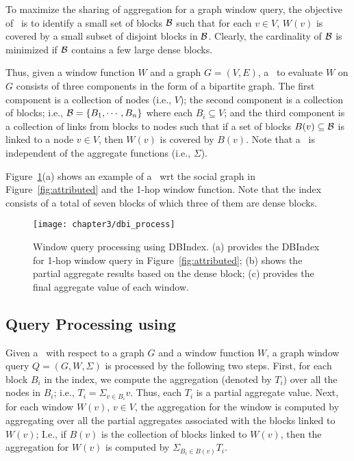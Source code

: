 To maximize the sharing of aggregation for a graph window query, 
the objective of \DBIndex\ is to identify a small set of blocks ${\cal B}$ such that
for each $v \in V$, $W(v)$ is covered by a small subset of disjoint blocks in ${\cal B}$.
Clearly, the cardinality of ${\cal B}$ is minimized if ${\cal B}$ contains a few large dense blocks.

Thus, given a window function $W$ and a graph $G=(V,E)$,
a \DBIndex\ to evaluate $W$ on $G$ consists of three components in the form of a bipartite graph.
The first component is a collection of nodes (i.e., $V$);
the second component is a collection of blocks; i.e., ${\cal B} = \{B_1,\cdots,B_n\}$ where each $B_i \subseteq V$;
and the third component is a collection of links from blocks to nodes
such that if a set of blocks $B(v) \subseteq {\cal B}$ is linked to a node $v \in V$,
then $W(v)$ is covered by $B(v)$.
Note that a \DBIndex\ is independent of the aggregate functions (i.e., $\Sigma$).

Figure~\ref{fig:dbi_agg}(a) shows an example of a \DBIndex\ wrt the social graph in Figure~\ref{fig:attributed} and the 1-hop window function.
Note that the index consists of a total of seven blocks of which three of them are dense blocks.

\begin{figure}[t]
\centerline{
	\texttt{[image: chapter3/dbi\_process]} 
	}
	\caption{Window query processing using DBIndex. (a) provides the DBIndex for 1-hop window query in Figure~\ref{fig:attributed}; (b) shows the partial aggregate results based on the dense block; (c) provides the final aggregate value of each window.}
	\label{fig:dbi_agg}
\end{figure}

\subsection{Query Processing using \DBIndex}
Given a \DBIndex\ with respect to a graph $G$ and a window function $W$, a graph window query $Q = (G, W, \Sigma)$ is processed by the following two steps.
First, for each block $B_i$ in the index, we compute the aggregation (denoted by $T_i$) over all the nodes in $B_i$;
i.e., $T_i = \Sigma_{v \in B_i} v$. 
Thus, each $T_i$ is a partial aggregate value.
Next, for each window $W(v)$, $v \in V$, the aggregation for the window is computed by aggregating over all the partial aggregates associated with the blocks linked to $W(v)$;
I.e., if $B(v)$ is the collection of blocks linked to $W(v)$, 
then the aggregation for $W(v)$ is computed by $\Sigma_{B_i \in B(v)} T_i$. 

